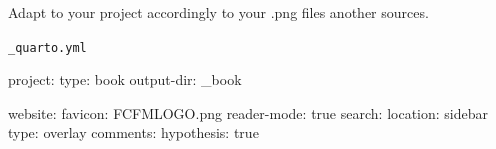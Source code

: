 \documentclass[
  letterpaper,
]{krantz}
\makeatletter
\newenvironment{Shaded}{\begin{snugshade}}{\end{snugshade}}
\newcommand{\AttributeTok}[1]{\textcolor[rgb]{0.40,0.45,0.13}{#1}}
\newcommand{\CharTok}[1]{\textcolor[rgb]{0.13,0.47,0.30}{#1}}
\newcommand{\FunctionTok}[1]{\textcolor[rgb]{0.28,0.35,0.67}{#1}}
\newcommand{\KeywordTok}[1]{\textcolor[rgb]{0.00,0.23,0.31}{#1}}
\newenvironment{kframe}{%
\medskip{}
\setlength{\fboxsep}{.8em}
 \def\at@end@of@kframe{}%
 \ifinner\ifhmode%
  \def\at@end@of@kframe{\end{minipage}}%
  \begin{minipage}{\columnwidth}%
 \fi\fi%
 \def\FrameCommand##1{\hskip\@totalleftmargin \hskip-\fboxsep
 \colorbox{shadecolor}{##1}\hskip-\fboxsep
     \hskip-\linewidth \hskip-\@totalleftmargin \hskip\columnwidth}%
 \MakeFramed {\advance\hsize-\width
   \@totalleftmargin\z@ \linewidth\hsize
   \@setminipage}}%
 {\par\unskip\endMakeFramed%
 \at@end@of@kframe}
\renewenvironment{Shaded}{\begin{kframe}}{\end{kframe}}
\theoremstyle{plain}
\theoremstyle{definition}
\theoremstyle{definition}
\theoremstyle{remark}
\makeatother
\begin{document}
Adapt to your project accordingly to your .png files another sources.

\begin{codelisting}

\caption{\texttt{\_quarto.yml}}

\begin{Shaded}
\begin{Highlighting}[]
\AttributeTok{  }\FunctionTok{project}\KeywordTok{:}
\AttributeTok{  }\FunctionTok{type}\KeywordTok{:}\AttributeTok{ book}
\AttributeTok{  }\FunctionTok{output{-}dir}\KeywordTok{:}\AttributeTok{ \_book}

\FunctionTok{website}\KeywordTok{:}
\AttributeTok{  }\FunctionTok{favicon}\KeywordTok{:}\AttributeTok{ FCFMLOGO.png}
\AttributeTok{  }\FunctionTok{reader{-}mode}\KeywordTok{:}\AttributeTok{ }\CharTok{true}
\AttributeTok{  }\FunctionTok{search}\KeywordTok{:}
\AttributeTok{    }\FunctionTok{location}\KeywordTok{:}\AttributeTok{ sidebar}
\AttributeTok{    }\FunctionTok{type}\KeywordTok{:}\AttributeTok{ overlay}
\AttributeTok{  }\FunctionTok{comments}\KeywordTok{:}
\AttributeTok{    }\FunctionTok{hypothesis}\KeywordTok{:}\AttributeTok{ }\CharTok{true}


\end{Highlighting}
\end{Shaded}
\end{codelisting}
\end{document}
